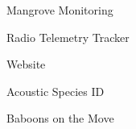 \item Mangrove Monitoring
\item Radio Telemetry Tracker
\item Website
\item Acoustic Species ID
\item Baboons on the Move
